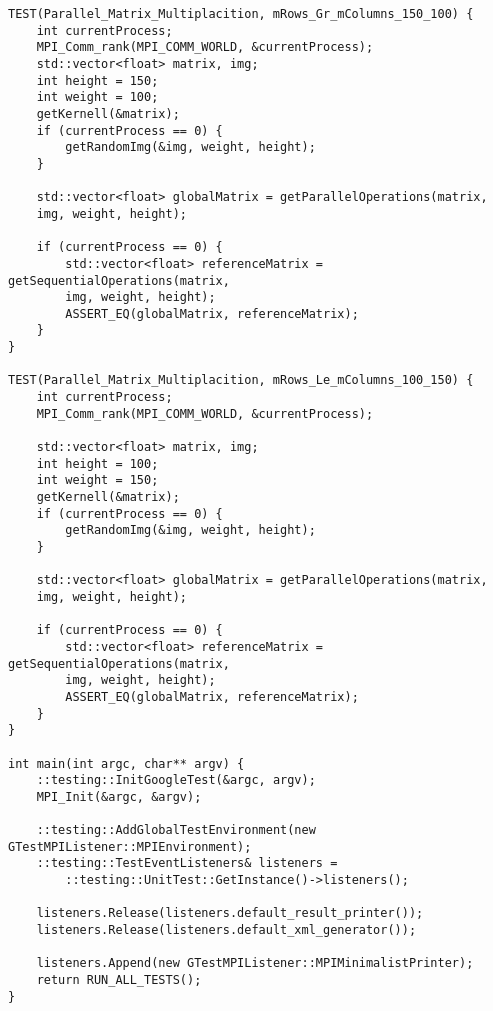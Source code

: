 \documentclass{report}
\begin{document}
\begin{lstlisting}
TEST(Parallel_Matrix_Multiplacition, mRows_Gr_mColumns_150_100) {
    int currentProcess;
    MPI_Comm_rank(MPI_COMM_WORLD, &currentProcess);
    std::vector<float> matrix, img;
    int height = 150;
    int weight = 100;
    getKernell(&matrix);
    if (currentProcess == 0) {
        getRandomImg(&img, weight, height);
    }

    std::vector<float> globalMatrix = getParallelOperations(matrix,
    img, weight, height);

    if (currentProcess == 0) {
        std::vector<float> referenceMatrix = getSequentialOperations(matrix,
        img, weight, height);
        ASSERT_EQ(globalMatrix, referenceMatrix);
    }
}

TEST(Parallel_Matrix_Multiplacition, mRows_Le_mColumns_100_150) {
    int currentProcess;
    MPI_Comm_rank(MPI_COMM_WORLD, &currentProcess);

    std::vector<float> matrix, img;
    int height = 100;
    int weight = 150;
    getKernell(&matrix);
    if (currentProcess == 0) {
        getRandomImg(&img, weight, height);
    }

    std::vector<float> globalMatrix = getParallelOperations(matrix,
    img, weight, height);

    if (currentProcess == 0) {
        std::vector<float> referenceMatrix = getSequentialOperations(matrix,
        img, weight, height);
        ASSERT_EQ(globalMatrix, referenceMatrix);
    }
}

int main(int argc, char** argv) {
    ::testing::InitGoogleTest(&argc, argv);
    MPI_Init(&argc, &argv);

    ::testing::AddGlobalTestEnvironment(new GTestMPIListener::MPIEnvironment);
    ::testing::TestEventListeners& listeners =
        ::testing::UnitTest::GetInstance()->listeners();

    listeners.Release(listeners.default_result_printer());
    listeners.Release(listeners.default_xml_generator());

    listeners.Append(new GTestMPIListener::MPIMinimalistPrinter);
    return RUN_ALL_TESTS();
}
\end{lstlisting}
\end{document}
